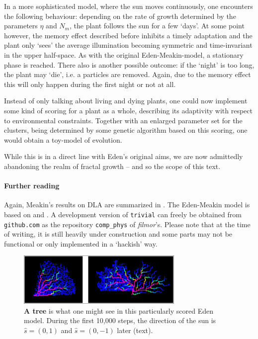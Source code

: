 \documentclass[twocolumn,10pt]{scrartcl}
\begin{document}
                In a more sophisticated model, where the sun moves continuously, one encounters the following
                behaviour: depending on the rate of growth determined by the parameters $\eta$ and $N_m$, the
                plant follows the sun for a few `days'. At some point however, the memory effect described before
                inhibits a timely adaptation and the plant only `sees' the average illumination becoming
                symmetric and time-invariant in the upper half-space. As with the original Eden-Meakin-model, a
                stationary phase is reached. There also is another possible outcome: if the `night' is too long,
                the plant may `die', i.e. a particles are removed. Again, due to the memory effect this will
                only happen during the first night or not at all.

                Instead of only talking about living and dying plants, one could now implement some kind of
                scoring for a plant as a whole, describing its adaptivity with respect to environmental constraints.
                Together with an enlarged parameter set for the clusters, being determined by some genetic
                algorithm based on this scoring, one would obtain a toy-model of evolution.

                While this is in a direct line with Eden's original aims, we are now admittedly abandoning
                the realm of fractal growth -- and so the scope of this text.

        {\small
            \paragraph{Further reading}
            Again, Meakin's results on DLA are summarized in \cite{src-meakin1}. The Eden-Meakin model is based
            on \cite{src-eden} and \cite{src-meakin-eden}.
            A development version of \texttt{trivial} can freely be obtained from \texttt{github.com} as the
            repository \texttt{comp\_phys} of \emph{filmor}'s. Please note that at the time of writing, it is still
            heavily under construction and some parts may not be functional or only implemented in a `hackish' way.
        }

        \begin{figure}
            \center
            \includegraphics[width=8cm]{img/edentree.png}
            \caption[A tree]
                {\small\textbf{A tree} is what one might see in this particularly scored Eden model. During
                the first 10,000 steps, the direction of the sun is $\hat s=(0,1)$ and $\hat s=(0,-1)$ later
                (text).}
            \label{fig-edentree}
        \end{figure}
\end{document}
